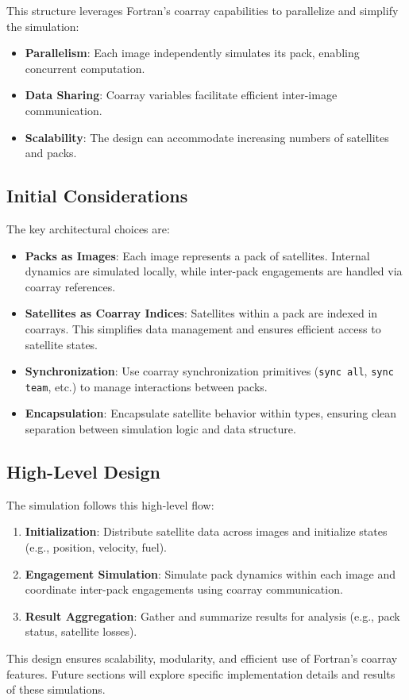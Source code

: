 \documentclass{article}
\begin{document}
This structure leverages Fortran’s coarray capabilities to parallelize and simplify the simulation:
\begin{itemize}
    \item \textbf{Parallelism}: Each image independently simulates its pack, enabling concurrent computation.
    \item \textbf{Data Sharing}: Coarray variables facilitate efficient inter-image communication.
    \item \textbf{Scalability}: The design can accommodate increasing numbers of satellites and packs.
\end{itemize}

\subsection{Initial Considerations}

The key architectural choices are:
\begin{itemize}
    \item \textbf{Packs as Images}:
        Each image represents a pack of satellites. Internal dynamics are simulated locally, while inter-pack engagements are handled via coarray references.
    \item \textbf{Satellites as Coarray Indices}:
        Satellites within a pack are indexed in coarrays. This simplifies data management and ensures efficient access to satellite states.
    \item \textbf{Synchronization}:
        Use coarray synchronization primitives (\texttt{sync all}, \texttt{sync team}, etc.) to manage interactions between packs.
    \item \textbf{Encapsulation}:
        Encapsulate satellite behavior within types, ensuring clean separation between simulation logic and data structure.
\end{itemize}

\subsection{High-Level Design}

The simulation follows this high-level flow:
\begin{enumerate}
    \item \textbf{Initialization}:
        Distribute satellite data across images and initialize states (e.g., position, velocity, fuel).
    \item \textbf{Engagement Simulation}:
        Simulate pack dynamics within each image and coordinate inter-pack engagements using coarray communication.
    \item \textbf{Result Aggregation}:
        Gather and summarize results for analysis (e.g., pack status, satellite losses).
\end{enumerate}

This design ensures scalability, modularity, and efficient use of Fortran’s coarray features. Future sections will explore specific implementation details and results of these simulations.
	
%
\printbibliography
\end{document}
